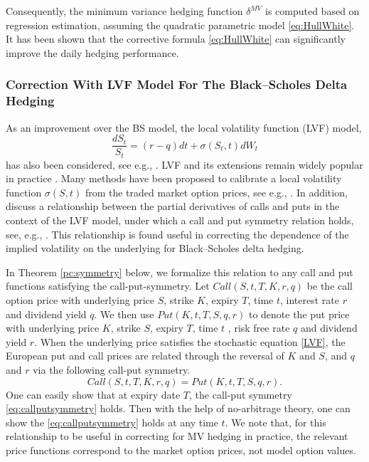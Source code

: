 \documentclass[letterpaper,12pt,titlepage,oneside,final]{book}
\numberwithin{equation}{section}
\theoremstyle{definition}
\begin{document}
 Consequently, the minimum variance hedging function $ \delta^{MV}$ is computed based on regression estimation, assuming 
 the quadratic parametric model \eqref{eq:HullWhite}.
 It has been shown \cite{hulloptimal} that the corrective formula \eqref{eq:HullWhite} can significantly improve the daily hedging performance.

 \subsubsection{Correction With LVF Model For  The Black–Scholes Delta Hedging}
 As an improvement over the BS model, the local volatility function (LVF) model,
 \begin{equation}\label{LVF}
\frac{dS_t}{S_t} = (r-q) dt + \sigma(S_t,t)   dW_t
\end{equation}
 has also been considered, see e.g., \citep{Dupire94,DermanKani94,DermanKani96}.
  LVF and its extensions remain widely popular in practice \cite{coleman2001reconstructing,crepey2004delta}. Many methods have been proposed to calibrate a local volatility function $\sigma(S,t)$ from the traded market option prices, see e.g., \citep{JackwerthRubenstein96,Andersen-etal98,CLV98}. In addition, \citet{coleman2001} discuss a relationship between the partial derivatives of  calls and puts in the context of the LVF model, under which a call and put symmetry relation holds, see,  e.g., \citep{Carr94,Carr98}. This relationship is found useful in correcting the dependence of the implied volatility on the underlying for Black–Scholes delta hedging.

In Theorem \ref{pc:symmetry} below, we formalize this relation \citep{coleman2001} to any call and put functions satisfying the call-put-symmetry.
Let $Call(S,t,T,K,r,q)$  be the call option price with underlying price $S$, strike $K$, expiry $T$, time $t$, interest rate $r$ and dividend yield $q$. We then use $Put(K,t,T,S,q,r)$ to denote  the put price with underlying price $K$, strike $S$, expiry $T$, time $t$ , risk free rate  $q$ and dividend yield $r$.  When the underlying price satisfies the stochastic equation \eqref{LVF}, the European put and call prices are related through the reversal of $K$ and $S$, and $q$ and $r$ via the following call-put symmetry.
\begin{equation}
	Call(S, t,T,K,r, q)=Put(K, t,T,S , q, r).
	\label{eq:callputsymmetry}
\end{equation}
One can easily show that at expiry date $T$, the call-put symmetry \eqref{eq:callputsymmetry} holds. Then with the help of no-arbitrage theory, one can show  the \eqref{eq:callputsymmetry} holds at any time $t$. We note that, for this relationship to be useful in correcting for MV hedging in practice, the relevant price functions  correspond to the market option prices, not model option values.
\end{document}
